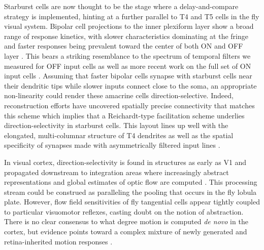 Starburst cells are now thought to be the stage where a delay-and-compare strategy is implemented, hinting at a further parallel to T4 and T5 cells in the fly visual system. Bipolar cell projections to the inner plexiform layer show a broad range of response kinetics, with slower characteristics dominating at the fringe and faster responses being prevalent toward the center of both ON and OFF layer \citep{Baden:2013ir}. This bears a striking resemblance to the spectrum of temporal filters we measured for OFF input cells as well as more recent work on the full set of ON input cells \citep{Arenz:2017aa,Strother:2017aa}. Assuming that faster bipolar cells synapse with starburst cells near their dendritic tips while slower inputs connect close to the soma, an appropriate non-linearity could render these amacrine cells direction-selective. Indeed, reconstruction efforts have uncovered spatially precise connectivity that matches this scheme \citep{Kim:2014aa} which implies that a Reichardt-type facilitation scheme underlies direction-selectivity in starburst cells. This layout lines up well with the elongated, multi-columnar structure of T4 dendrites as well as the spatial specificity of synapses made with asymmetrically filtered input lines \citep{Takemura:2017aa}.

In visual cortex, direction-selectivity is found in structures as early as V1 and propagated downstream to integration areas where increasingly abstract representations and global estimates of optic flow are computed \citep[for a review of motion-critical primate area MT, see][]{Born:2005aa}. This processing stream could be construed as paralleling the pooling that occurs in the fly lobula plate. However, flow field sensitivities of fly tangential cells appear tightly coupled to particular visuomotor reflexes, casting doubt on the notion of abstraction. There is no clear consensus to what degree motion is computed \textit{de novo} in the cortex, but evidence points toward a complex mixture of newly generated and retina-inherited motion responses \citep{CruzMartin:2014aa}.


